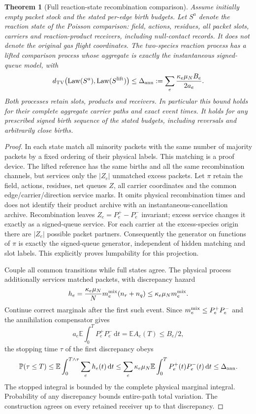 \documentclass[11pt,oneside,openany]{book}
\newtheorem{theorem}{Theorem}[chapter]
\theoremstyle{definition}
\theoremstyle{remark}\newtheorem{remark}[theorem]{Remark}
\providecommand{\E}{\mathbb E}
\providecommand{\Prb}{\mathbb P}
\providecommand{\TV}{d_{\mathrm{TV}}}
\providecommand{\dd}{\,\mathrm d}
\providecommand{\pLaw}{\operatorname{Law}}
\begin{document}
\begin{theorem}[Full reaction-state recombination comparison]\label{p:recombination}
Assume initially empty packet stock and the stated per-edge birth budgets. Let $S^a$ denote the reaction state of the Poisson comparison: field, actions, residues, all packet slots, carriers and reaction-product receivers, including null-contact records. It does not denote the original gas flight coordinates. The two-species reaction process has a lifted comparison process whose aggregate is exactly the instantaneous signed-queue model, with
\begin{equation}
 \TV\bigl(\pLaw(S^{a}),\pLaw(S^{\rm lift})\bigr)
 \le \Delta_{\rm ann}:=\sum_e\frac{\kappa_e\mu_NB_e}{2a_e}.
 \label{p:eq-annerror}
\end{equation}
Both processes retain slots, products and receivers. In particular this bound holds for their complete aggregate carrier paths and exact event times. It holds for any prescribed signed birth sequence of the stated budgets, including reversals and arbitrarily close births.
\end{theorem}
\begin{proof}
In each state match all minority packets with the same number of majority packets by a fixed ordering of their physical labels. This matching is a proof device. The lifted reference has the same births and all the same recombination channels, but services only the $|Z_e|$ unmatched excess packets. Let $\pi$ retain the field, actions, residues, net queues $Z$, all carrier coordinates and the common edge/carrier/direction service marks. It omits physical recombination times and does not identify their product archive with an instantaneous-cancellation archive. Recombination leaves $Z_e=P_e^+-P_e^-$ invariant; excess service changes it exactly as a signed-queue service. For each carrier at the excess-species origin there are $|Z_e|$ possible packet partners. Consequently the generator on functions of $\pi$ is exactly the signed-queue generator, independent of hidden matching and slot labels. This explicitly proves lumpability for this projection.

Couple all common transitions while full states agree. The physical process additionally services matched packets, with discrepancy hazard
\[
 h_e=\frac{\kappa_e\mu_N}{N}m_e^{\rm mix}(n_r+n_q)\le\kappa_e\mu_Nm_e^{\rm mix}.
\]
Continue correct marginals after the first such event. Since $m_e^{\rm mix}\le P_e^+P_e^-$ and the annihilation compensator gives
\[
 a_e\E\int_0^T P_e^+P_e^-\dd t=\E A_e(T)\le B_e/2,
\]
the stopping time $\tau$ of the first discrepancy obeys
\[
 \Prb(\tau\le T)\le
 \E\int_0^{T\wedge\tau}\sum_e h_e(t)\dd t
 \le\sum_e\kappa_e\mu_N\E\int_0^T P_e^+(t)P_e^-(t)\dd t
 \le\Delta_{\rm ann}.
\]
The stopped integral is bounded by the complete physical marginal
integral.  Probability of any discrepancy bounds entire-path total variation. The construction agrees on every retained receiver up to that discrepancy.
\end{proof}
\end{document}
